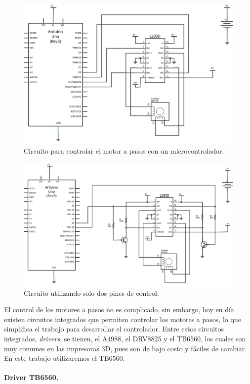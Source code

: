 \begin{figure}[h!]
	\centering
	\includegraphics[width=0.7\linewidth]{Imagenes/2/BIPOLAR-4-FILS}
	\caption[Circuito para controlar el motor a pasos con un microcontrolador.]{Circuito para controlar el motor a pasos con un microcontrolador. \cite{Diymakers}}
	\label{fig:bipolar-4-fils}
\end{figure}

\begin{figure}[h!]
	\centering
	\includegraphics[width=0.7\linewidth]{Imagenes/2/bipolar-2-fils}
	\caption{Circuito utilizando solo dos pines de control. \cite{Diymakers}}
	\label{fig:bipolar-2-fils}
\end{figure}

El control de los motores a pasos no es complicado, sin embargo, hoy en día existen circuitos integrados que permiten controlar los motores a pasos, lo que simplifica el trabajo para desarrollar el controlador. Entre estos circuitos integrados, \textit{drivers}, se tienen, el A4988, el DRV8825 y el TB6560, los cuales son muy comunes en las impresoras 3D, pues son de bajo costo y fáciles de cambiar. En este trabajo utilizaremos el TB6560.

\paragraph{Driver TB6560.}
 
